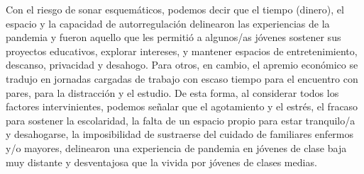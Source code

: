 \begin{refsection}
Con el riesgo de sonar esquemáticos, podemos decir que el tiempo (dinero), el espacio y la capacidad de autorregulación delinearon las experiencias de la pandemia y fueron aquello que les permitió a algunos/as jóvenes sostener sus proyectos educativos, explorar intereses, y mantener espacios de entretenimiento, descanso, privacidad y desahogo. Para otros, en cambio, el apremio económico se tradujo en jornadas cargadas de trabajo con escaso tiempo para el encuentro con pares, para la distracción y el estudio. De esta forma, al considerar todos los factores intervinientes, podemos señalar que el agotamiento y el estrés, el fracaso para sostener la escolaridad, la falta de un espacio propio para estar tranquilo/a y desahogarse, la imposibilidad de sustraerse del cuidado de familiares enfermos y/o mayores, delinearon una experiencia de pandemia en jóvenes de clase baja muy distante y desventajosa que la vivida por jóvenes de clases medias.


\section*{\refname}
\printbibliography[heading=none]
\end{refsection}

